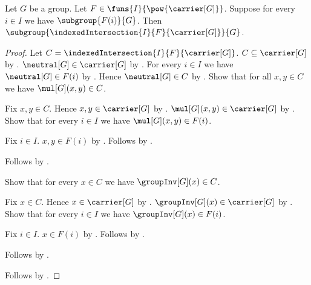 \begin{theorem}\label{subgroup_indexed_intersection}
    Let $G$ be a group.
    Let $F\in\funs{I}{\pow{\carrier[G]}}$.
    Suppose for every $i\in I$ we have $\subgroup{F(i)}{G}$.
    Then
        $\subgroup{\indexedIntersection{I}{F}{\carrier[G]}}{G}$.
\end{theorem}
\begin{proof}
    Let $C=\indexedIntersection{I}{F}{\carrier[G]}$.
    $C\subseteq\carrier[G]$ by
        .
    $\neutral[G]\in\carrier[G]$ by
        .
    For every $i\in I$ we have $\neutral[G]\in F(i)$ by
        .
    Hence $\neutral[G]\in C$ by .
    Show that for all $x,y\in C$ we have $\mul[G](x,y)\in C$.
    \begin{subproof}
        Fix $x,y\in C$.
        Hence $x,y\in\carrier[G]$ by
            .
        $\mul[G](x,y)\in\carrier[G]$ by
            .
        Show that for every $i\in I$ we have $\mul[G](x,y)\in F(i)$.
        \begin{subproof}
            Fix $i\in I$.
            $x,y\in F(i)$ by .
            Follows by .
        \end{subproof}
        Follows by .
    \end{subproof}
    Show that for every $x\in C$ we have $\groupInv[G](x)\in C$.
    \begin{subproof}
        Fix $x\in C$.
        Hence $x\in\carrier[G]$ by
            .
        $\groupInv[G](x)\in\carrier[G]$ by
            .
        Show that for every $i\in I$ we have
            $\groupInv[G](x)\in F(i)$.
        \begin{subproof}
            Fix $i\in I$.
            $x\in F(i)$ by .
            Follows by .
        \end{subproof}
        Follows by .
    \end{subproof}
    Follows by .
\end{proof}

